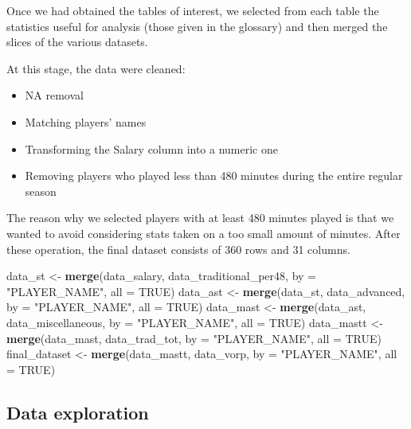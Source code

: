 \documentclass[
]{article}
\newenvironment{Shaded}{\begin{snugshade}}{\end{snugshade}}
\newcommand{\AttributeTok}[1]{\textcolor[rgb]{0.13,0.29,0.53}{#1}}
\newcommand{\ConstantTok}[1]{\textcolor[rgb]{0.56,0.35,0.01}{#1}}
\newcommand{\FunctionTok}[1]{\textcolor[rgb]{0.13,0.29,0.53}{\textbf{#1}}}
\newcommand{\NormalTok}[1]{#1}
\newcommand{\OtherTok}[1]{\textcolor[rgb]{0.56,0.35,0.01}{#1}}
\newcommand{\StringTok}[1]{\textcolor[rgb]{0.31,0.60,0.02}{#1}}
\providecommand{\tightlist}{%
  \setlength{\itemsep}{0pt}\setlength{\parskip}{0pt}}
\begin{document}
Once we had obtained the tables of interest, we selected from each table
the statistics useful for analysis (those given in the glossary) and
then merged the slices of the various datasets.

At this stage, the data were cleaned:

\begin{itemize}
\tightlist
\item
  NA removal
\item
  Matching players' names
\item
  Transforming the Salary column into a numeric one
\item
  Removing players who played less than 480 minutes during the entire
  regular season
\end{itemize}

The reason why we selected players with at least 480 minutes played is
that we wanted to avoid considering stats taken on a too small amount of
minutes. After these operation, the final dataset consists of 360 rows
and 31 columns.

\begin{Shaded}
\begin{Highlighting}[]
\NormalTok{data\_st }\OtherTok{\textless{}{-}} \FunctionTok{merge}\NormalTok{(data\_salary, data\_traditional\_per48, }\AttributeTok{by =} \StringTok{"PLAYER\_NAME"}\NormalTok{, }\AttributeTok{all =} \ConstantTok{TRUE}\NormalTok{)}
\NormalTok{data\_ast }\OtherTok{\textless{}{-}} \FunctionTok{merge}\NormalTok{(data\_st, data\_advanced, }\AttributeTok{by =} \StringTok{"PLAYER\_NAME"}\NormalTok{, }\AttributeTok{all =} \ConstantTok{TRUE}\NormalTok{)}
\NormalTok{data\_mast }\OtherTok{\textless{}{-}} \FunctionTok{merge}\NormalTok{(data\_ast, data\_miscellaneous, }\AttributeTok{by =} \StringTok{"PLAYER\_NAME"}\NormalTok{, }\AttributeTok{all =} \ConstantTok{TRUE}\NormalTok{)}
\NormalTok{data\_mastt }\OtherTok{\textless{}{-}} \FunctionTok{merge}\NormalTok{(data\_mast, data\_trad\_tot, }\AttributeTok{by =} \StringTok{"PLAYER\_NAME"}\NormalTok{, }\AttributeTok{all =} \ConstantTok{TRUE}\NormalTok{)}
\NormalTok{final\_dataset }\OtherTok{\textless{}{-}} \FunctionTok{merge}\NormalTok{(data\_mastt, data\_vorp, }\AttributeTok{by =} \StringTok{"PLAYER\_NAME"}\NormalTok{, }\AttributeTok{all =} \ConstantTok{TRUE}\NormalTok{)}
\end{Highlighting}
\end{Shaded}

\hypertarget{data-exploration}{%
\subsection{Data exploration}\label{data-exploration}}
\end{document}
